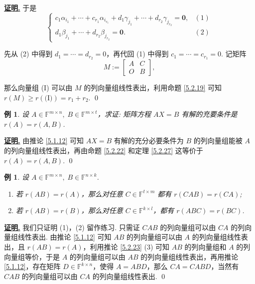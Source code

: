 \documentclass[10pt,openany]{article}
\theoremstyle{thmstyle} %
\theoremstyle{defstyle} %
\theoremstyle{prostyle} %
\theoremstyle{exastyle}
\newtheorem{example}[theorem]{例}
\theoremstyle{remstyle}
\renewenvironment{proof}[1][证明]{\par\underline{\textbf{#1.}} \;\fangsong}{\qed\par}
\newcommand{\F}{\mathbb{F}}
\newcommand{\mn}{^{m \times n}}
\begin{document}
\begin{proof}
	于是
	\[ \left\{ \begin{array}{ll}
		c_1\alpha_{i_1}+\cdots+c_{r_1}\alpha_{i_{r_1}}+d_1\gamma_{j_1}+\cdots+d_{r_2}\gamma_{j_{r_2}}=\bm{0},  & (1) \\
		d_1\beta_{j_1}+\cdots+d_{r_2}\beta_{j_{r_2}}=\bm{0}. & (2)
	\end{array}\right. \]
	
	先从 (2) 中得到 \( d_1=\cdots=d_{r_2}=0 \)，再代回 (1) 中得到 \( c_1=\cdots=c_{r_1}=0 \). 记矩阵
	\[ M:=\begin{bmatrix}
		A & C \\ O & B
	\end{bmatrix}, \]
	
	那么向量组 (I) 可以由 \( M \) 的列向量组线性表出，利用命题 \ref{5.2.19} 可知 \( r(M) \geq r(\text{(I)})=r_1+r_2 \).
\end{proof}



\begin{example} 
	设 \( A \in \F\mn, \; B \in \F^{m \times t} \)，求证: 矩阵方程 \( AX = B \) 有解的充要条件是 \( r(A) = r(A,B) \).
\end{example}

\begin{proof}
	由推论 \ref{5.1.12} 可知 \( AX=B \) 有解的充分必要条件为 \( B \) 的列向量组能被 \( A \) 的列向量组线性表出，再由命题 \ref{5.2.22} 和定理 \ref{5.2.27} 这等价于 \( r(A) = r(A,B) \).
\end{proof}



\begin{example} 
	设 \(  A \in \F\mn, \; B \in \F^{n \times k} \). 
	\begin{enumerate}[(1)]
		\item 若 \( r(AB)=r(A) \)，那么对任意 \( C \in \F^{t \times m} \) 都有 \( r(CAB)=r(CA) \);
		\item 若 \( r(AB)=r(B) \)，那么对任意 \( C \in \F^{k \times l} \)，都有 \( r(ABC)=r(BC) \).
	\end{enumerate}
\end{example}


\begin{proof}
	我们只证明 (1)，(2) 留作练习. 只需证 \( CAB \) 的列向量组可以由 \( CA \) 的列向量组线性表出. 由推论 \ref{5.1.12} 可知 \( AB \) 的列向量组可以由 \( A \) 的列向量组线性表出，且 \( r(AB)=r(A) \)，利用推论 \ref{5.2.23} (3) 可知 \( AB \) 的列向量组和 \( A \) 的列向量组等价，于是 \( A \) 的列向量组可以由 \(  AB \) 的列向量组线性表出，再用推论\ref{5.1.12}，存在矩阵 \( D \in \F^{k \times n} \)，使得 \( A=ABD \)，那么 \( CA=CABD \)，当然有 \( CAB \) 的列向量组可以由 \( CA \) 的列向量组线性表出.
\end{proof}
\end{document}

